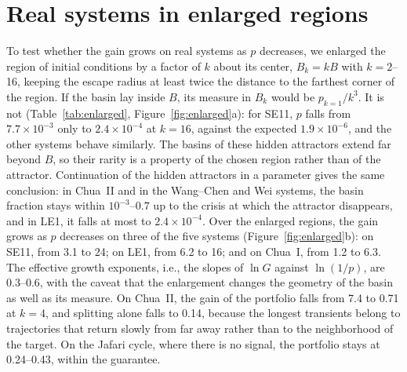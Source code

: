 \section{Real systems in enlarged regions}\label{app:enlarged}

To test whether the gain grows on real systems as $p$ decreases, we enlarged the region of initial conditions by a factor of $k$ about its center, $B_k=kB$ with $k=2$--16, keeping the escape radius at least twice the distance to the farthest corner of the region. If the basin lay inside $B$, its measure in $B_k$ would be $p_{k=1}/k^3$. It is not (Table~\ref{tab:enlarged}, Figure~\ref{fig:enlarged}a): for SE11, $p$ falls from $7.7\times10^{-3}$ only to $2.4\times10^{-4}$ at $k=16$, against the expected $1.9\times10^{-6}$, and the other systems behave similarly. The basins of these hidden attractors extend far beyond $B$, so their rarity is a property of the chosen region rather than of the attractor. Continuation of the hidden attractors in a parameter gives the same conclusion: in Chua~II and in the Wang--Chen and Wei systems, the basin fraction stays within $10^{-3}$--$0.7$ up to the crisis at which the attractor disappears, and in LE1, it falls at most to $2.4\times10^{-4}$. Over the enlarged regions, the gain grows as $p$ decreases on three of the five systems (Figure~\ref{fig:enlarged}b): on SE11, from 3.1 to 24; on LE1, from 6.2 to 16; and on Chua~I, from 1.2 to 6.3. The effective growth exponents, i.e., the slopes of $\ln G$ against $\ln(1/p)$, are 0.3--0.6, with the caveat that the enlargement changes the geometry of the basin as well as its measure. On Chua~II, the gain of the portfolio falls from 7.4 to 0.71 at $k=4$, and splitting alone falls to 0.14, because the longest transients belong to trajectories that return slowly from far away rather than to the neighborhood of the target. On the Jafari cycle, where there is no signal, the portfolio stays at 0.24--0.43, within the guarantee.

